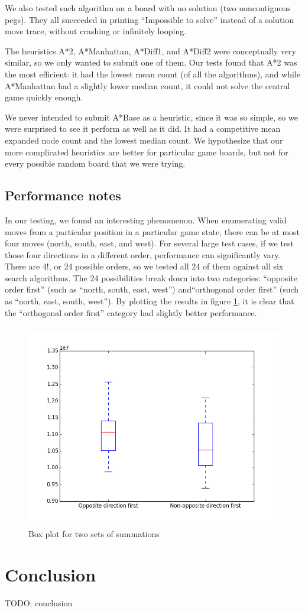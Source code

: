 \documentclass[11pt]{article}
\begin{document}
We also tested each algorithm on a board with no solution (two noncontiguous pegs).
They all succeeded in printing ``Impossible to solve'' instead of a solution move
trace, without crashing or infinitely looping.

The heuristics A*2, A*Manhattan, A*Diff1, and A*Diff2 were conceptually very
similar, so we only wanted to submit one of them. Our tests found that A*2 was
the most efficient: it had the lowest mean count (of all the algorithms), and
while A*Manhattan had a slightly lower median count, it could not solve the
central game quickly enough.

We never intended to submit A*Base as a heuristic, since it was so simple, so we
were surprised to see it perform as well as it did. It had a competitive mean
expanded node count and the lowest median count. We hypothesize that our more
complicated heuristics are better for particular game boards, but not for every
possible random board that we were trying.

\subsection{Performance notes}

In our testing, we found an interesting phenomenon. When enumerating valid moves
from a particular position in a particular game state, there can be at most four
moves (north, south, east, and west). For several large test cases, if we test
those four directions in a different order, performance can significantly vary.
There are $4!$, or 24 possible orders, so we tested all 24 of them against all
six search algorithms. The 24 possibilities break down into two categories:
``opposite order first'' (such as ``north, south, east, west'') and``orthogonal
order first'' (such as ``north, east, south, west''). By plotting the results in
figure \ref{fig_boxplot}, it is clear that the ``orthogonal order first'' category
had slightly better performance.

\begin{figure}[h!]
\centering
\includegraphics[height=3.5in, width=4.5in]{figs/boxplot.png}
\caption{Box plot for two sets of summations}
\label{fig_boxplot}
\end{figure}

\section{Conclusion}

TODO: conclusion
\end{document}
